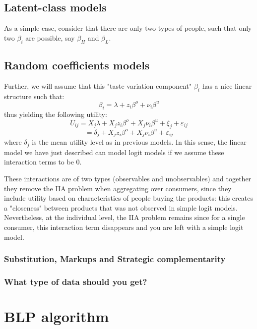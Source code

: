 \subsection{Latent-class models}

As a simple case, consider that there are only two types of people, such that only two $\beta_i$ are possible, say $\beta_H$ and $\beta_L$.



\subsection{Random coefficients models}

Further, we will assume that this "taste variation component" $\beta_i$ has a nice linear structure such that: $$\beta_i = \lambda + z_i\beta^o + \nu_i\beta^u $$ thus yielding the following utility: $$ U_{ij} = X_j\lambda + X_jz_i\beta^o + X_j\nu_i\beta^u + \xi_j + \varepsilon_{ij} $$ $$ = \delta_j + X_jz_i\beta^o + X_j\nu_i\beta^u + \varepsilon_{ij} $$ where $\delta_j$ is the mean utility level as in previous models. In this sense, the linear model we have just described can model logit models if we assume these interaction terms to be 0. 

These interactions are of two types (observables and unobservables) and together they remove the IIA problem when aggregating over consumers, since they include utility based on characteristics of people buying the products: this creates a "closeness" between products that was not observed in simple logit models. Nevertheless, at the individual level, the IIA problem remains since for a single consumer, this interaction term disappears and you are left with a simple logit model.

\subsubsection{Substitution, Markups and Strategic complementarity}



\subsubsection{What type of data should you get?}



\section{BLP algorithm}


